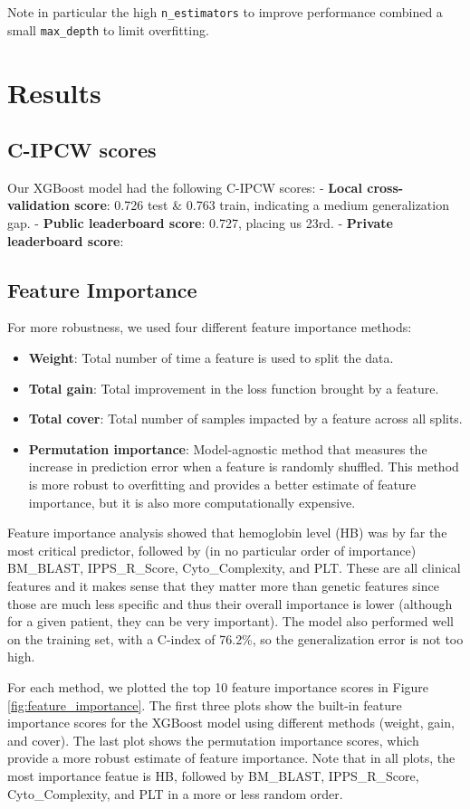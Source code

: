 \documentclass{article}
\begin{document}
Note in particular the high \texttt{n\_estimators} to improve performance combined a small \texttt{max_depth} to limit overfitting.


\section{Results}
\subsection{C-IPCW scores}
Our XGBoost model had the following C-IPCW scores:
- \textbf{Local cross-validation score}: 0.726 test & 0.763 train, indicating a medium generalization gap.
- \textbf{Public leaderboard score}: 0.727, placing us 23rd.
- \textbf{Private leaderboard score}: 

\subsection{Feature Importance}
For more robustness, we used four different feature importance methods:
\begin{itemize}
    \item \textbf{Weight}: Total number of time a feature is used to split the data.
    \item \textbf{Total gain}: Total improvement in the loss function brought by a feature.
    \item \textbf{Total cover}: Total number of samples impacted by a feature across all splits.
    \item \textbf{Permutation importance}: Model-agnostic method that measures the increase in prediction error when a feature is randomly shuffled. This method is more robust to overfitting and provides a better estimate of feature importance, but it is also more computationally expensive.
\end{itemize}
Feature importance analysis showed that hemoglobin level (HB) was by far the most critical predictor, followed by (in no particular order of importance) BM\_BLAST, IPPS\_R\_Score, Cyto\_Complexity, and PLT. These are all clinical features and it makes sense that they matter more than genetic features since those are much less specific and thus their overall importance is lower (although for a given patient, they can be very important). The model also performed well on the training set, with a C-index of 76.2\%, so the generalization error is not too high.

For each method, we plotted the top 10 feature importance scores in Figure \ref{fig:feature_importance}. The first three plots show the built-in feature importance scores for the XGBoost model using different methods (weight, gain, and cover). The last plot shows the permutation importance scores, which provide a more robust estimate of feature importance. Note that in all plots, the most importance featue is HB, followed by BM\_BLAST, IPPS\_R\_Score, Cyto\_Complexity, and PLT in a more or less random order.
\end{document}

